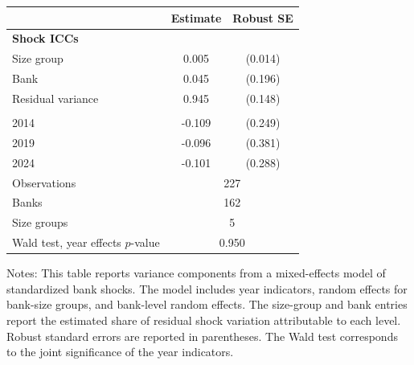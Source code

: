 \begin{threeparttable}
\begin{tabular}{lcc}
\toprule
 & Estimate & Robust SE \\
\midrule
\multicolumn{3}{l}{\textbf{Shock ICCs}} \\
Size group & 0.005 & (0.014) \\
Bank & 0.045 & (0.196) \\
Residual variance & 0.945 & (0.148) \\
\addlinespace
\multicolumn{3}{l}{\textbf{Year effects}} \\
2014 & -0.109 & (0.249) \\
2019 & -0.096 & (0.381) \\
2024 & -0.101 & (0.288) \\
\addlinespace
Observations & \multicolumn{2}{c}{227} \\
Banks & \multicolumn{2}{c}{162} \\
Size groups & \multicolumn{2}{c}{5} \\
Wald test, year effects $p$-value & \multicolumn{2}{c}{0.950} \\
\bottomrule
\end{tabular}
\begin{tablenotes}[flushleft]
\footnotesize
\item Notes: This table reports variance components from a mixed-effects model of standardized bank shocks. The model includes year indicators, random effects for bank-size groups, and bank-level random effects. The size-group and bank entries report the estimated share of residual shock variation attributable to each level. Robust standard errors are reported in parentheses. The Wald test corresponds to the joint significance of the year indicators.
\end{tablenotes}
\end{threeparttable}
